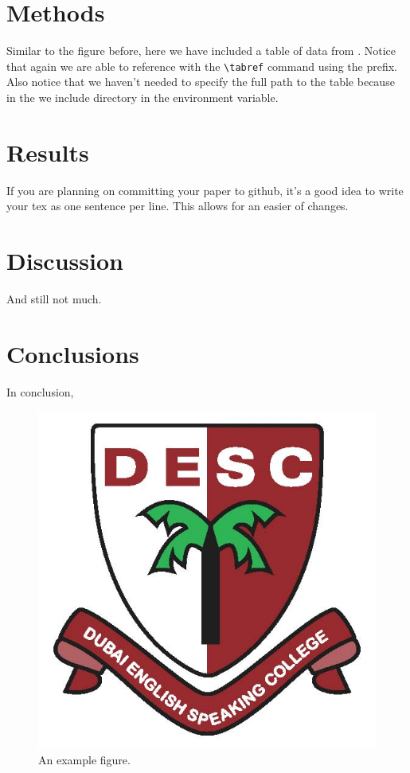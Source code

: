 \documentclass[\docopts]{\docclass}
\begin{document}
\section{Methods}
\label{sec:methods}

Similar to the figure before, here we have included a table of data from .  
Notice that again we are able to reference  with the \verb=\tabref= command using the  prefix. 
Also notice that we haven't needed to specify the full path to the table because in the  we include  directory in the  environment variable.



\section{Results}
\label{sec:results}

If you are planning on committing your paper to github, it's a good idea to write your tex as one sentence per line. 
This allows for an easier  of changes.

\section{Discussion}
\label{sec:discussion}

And still not much.

\section{Conclusions}
\label{sec:conclusions}

In conclusion, 

\begin{figure}[h]
\includegraphics[width=\columnwidth]{example.jpg}
\caption{An example figure. \label{fig:example}}
\end{figure}





\end{document}

